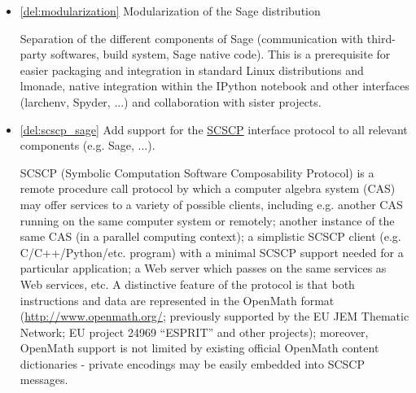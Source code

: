 \begin{Workpackage}{\thewpno}
\begin{WPDeliverables}
\begin{itemize}
    \item \ref{del:modularization} Modularization of the Sage distribution

      Separation of the different components of Sage (communication with
      third-party softwares, build system, Sage native code). This is a
      prerequisite for easier packaging and integration in standard Linux
      distributions and lmonade, native integration within the IPython
      notebook and other interfaces (larchenv, Spyder, ...) and
      collaboration with sister projects.



    \item \ref{del:scscp_sage} Add support for the
      \href{http://www.symbolic-computing.org/}{SCSCP} interface protocol
      to all relevant components (e.g. Sage, ...).
        
        SCSCP (Symbolic Computation Software Composability Protocol) is a 
        remote procedure call protocol by which a computer algebra system (CAS) 
        may offer services to a variety of possible clients, including e.g. 
        another CAS running on the same computer system or remotely; 
        another instance of the same CAS (in a parallel computing context);
        a simplistic SCSCP client (e.g. C/C++/Python/etc. program) with a 
        minimal SCSCP support needed for a particular application; 
        a Web server which passes on the same services as Web services, etc.
        A distinctive feature of the protocol is that both instructions and data
        are represented in the OpenMath format (\url{http://www.openmath.org/};
        previously supported by the EU JEM Thematic Network; EU project 24969 ``ESPRIT''
        and other projects); moreover, OpenMath support is not limited by 
        existing official OpenMath content dictionaries - private encodings may 
        be easily embedded into SCSCP messages.
        

\end{itemize}
\end{WPDeliverables}
\end{Workpackage}
